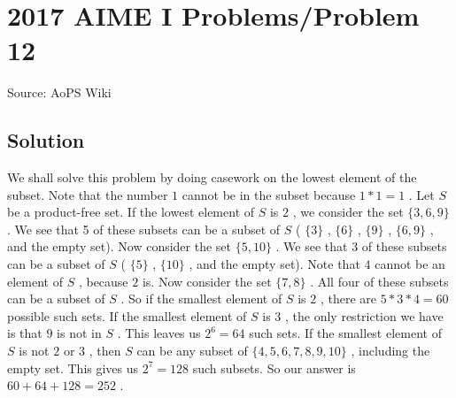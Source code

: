 \documentclass[12pt]{article}
\begin{document}
\section*{{2017 AIME I Problems/Problem 12}}
Source: AoPS Wiki

\subsection*{Solution}
We shall solve this problem by doing casework on the lowest element of the subset. Note that the number $1$ cannot be in the subset because $1*1=1$ . Let $S$ be a product-free set. If the lowest element of $S$ is $2$ , we consider the set $\{3, 6, 9\}$ . We see that 5 of these subsets can be a subset of $S$ ( $\{3\}$ , $\{6\}$ , $\{9\}$ , $\{6, 9\}$ , and the empty set). Now consider the set $\{5, 10\}$ . We see that 3 of these subsets can be a subset of $S$ ( $\{5\}$ , $\{10\}$ , and the empty set). Note that $4$ cannot be an element of $S$ , because $2$ is. Now consider the set $\{7, 8\}$ . All four of these subsets can be a subset of $S$ . So if the smallest element of $S$ is $2$ , there are $5*3*4=60$ possible such sets. If the smallest element of $S$ is $3$ , the only restriction we have is that $9$ is not in $S$ . This leaves us $2^6=64$ such sets. If the smallest element of $S$ is not $2$ or $3$ , then $S$ can be any subset of $\{4, 5, 6, 7, 8, 9, 10\}$ , including the empty set. This gives us $2^7=128$ such subsets. So our answer is $60+64+128=\boxed{252}$ .
\end{document}
